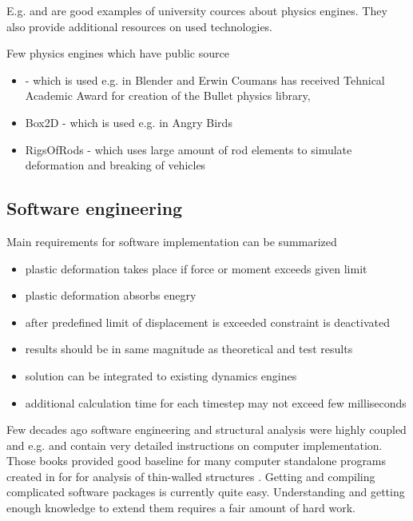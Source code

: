 E.g. \cite{cornell.cs3152} and \cite{cornell.cs5643} are good examples of  university cources
about physics engines. They also provide additional resources on used technologies.

Few physics engines which have public source

\begin{itemize}
\item \bullet - \cite{bullet} which is used e.g. in Blender and Erwin Coumans
 has received Tehnical Academic Award for creation of the Bullet physics library, \cite{erwin.oscar}
\item Box2D - \cite{box2d} which is used e.g. in Angry Birds
\item RigsOfRods - \cite{ror} which uses large amount of rod elements to simulate deformation and breaking of vehicles
\end{itemize}


\subsection{Software engineering}

Main requirements for software implementation can be summarized
\begin{itemize}
\item plastic deformation takes place if force or moment exceeds given limit
\item plastic deformation absorbs enegry
\item after predefined limit of displacement is exceeded constraint is deactivated 
\item results should be in same magnitude as theoretical and test results
\item solution can be integrated to existing dynamics engines
\item additional calculation time for each timestep may not exceed few milliseconds 
\end{itemize}

Few decades ago software engineering and structural analysis were highly coupled
and e.g. \cite{bathe} and \cite{cook} contain very detailed instructions on
computer implementation. Those books provided good baseline for many computer 
standalone programs created in \lut for for analysis of 
thin-walled structures \cite{agifap,fsm,vtb}.  
Getting and compiling complicated software packages is currently quite easy. 
Understanding and getting enough knowledge to extend them requires a fair amount of hard work.

